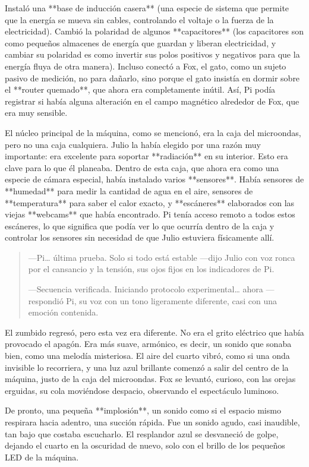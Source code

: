 \documentclass[a4paper,12pt]{book}
\begin{document}
Instaló una **base de inducción casera** (una especie de sistema que permite que la energía se mueva sin cables, controlando el voltaje o la fuerza de la electricidad). Cambió la polaridad de algunos **capacitores** (los capacitores son como pequeños almacenes de energía que guardan y liberan electricidad, y cambiar su polaridad es como invertir sus polos positivos y negativos para que la energía fluya de otra manera). Incluso conectó a Fox, el gato, como un sujeto pasivo de medición, no para dañarlo, sino porque el gato insistía en dormir sobre el **router quemado**, que ahora era completamente inútil. Así, Pi podía registrar si había alguna alteración en el campo magnético alrededor de Fox, que era muy sensible.

El núcleo principal de la máquina, como se mencionó, era la caja del microondas, pero no una caja cualquiera. Julio la había elegido por una razón muy importante: era excelente para soportar **radiación** en su interior. Esto era clave para lo que él planeaba. Dentro de esta caja, que ahora era como una especie de cámara especial, había instalado varios **sensores**. Había sensores de **humedad** para medir la cantidad de agua en el aire, sensores de **temperatura** para saber el calor exacto, y **escáneres** elaborados con las viejas **webcams** que había encontrado. Pi tenía acceso remoto a todos estos escáneres, lo que significa que podía ver lo que ocurría dentro de la caja y controlar los sensores sin necesidad de que Julio estuviera físicamente allí.

\begin{quote}
    —Pi… última prueba. Solo si todo está estable —dijo Julio con voz ronca por el cansancio y la tensión, sus ojos fijos en los indicadores de Pi.

    —Secuencia verificada. Iniciando protocolo experimental… ahora —respondió Pi, su voz con un tono ligeramente diferente, casi con una emoción contenida.
\end{quote}

El zumbido regresó, pero esta vez era diferente. No era el grito eléctrico que había provocado el apagón. Era más suave, armónico, es decir, un sonido que sonaba bien, como una melodía misteriosa. El aire del cuarto vibró, como si una onda invisible lo recorriera, y una luz azul brillante comenzó a salir del centro de la máquina, justo de la caja del microondas. Fox se levantó, curioso, con las orejas erguidas, su cola moviéndose despacio, observando el espectáculo luminoso.

De pronto, una pequeña **implosión**, un sonido como si el espacio mismo respirara hacia adentro, una succión rápida. Fue un sonido agudo, casi inaudible, tan bajo que costaba escucharlo. El resplandor azul se desvaneció de golpe, dejando el cuarto en la oscuridad de nuevo, solo con el brillo de los pequeños LED de la máquina.
\end{document}
